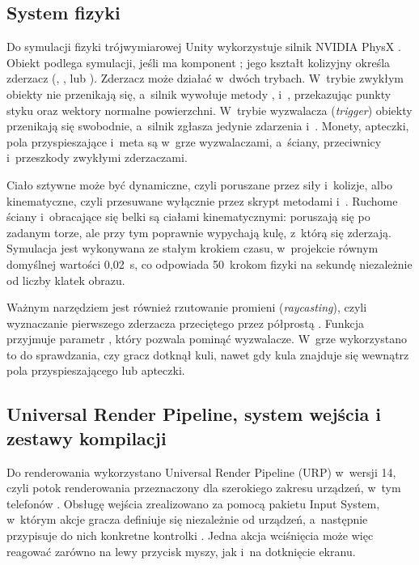 \subsection{System fizyki}

Do symulacji fizyki trójwymiarowej Unity wykorzystuje silnik NVIDIA PhysX
\cite{unity-physics}. Obiekt podlega symulacji, jeśli ma komponent ;
jego kształt kolizyjny określa zderzacz (, ,
 lub ). Zderzacz może działać w~dwóch trybach.
W~trybie zwykłym obiekty nie przenikają się, a~silnik wywołuje metody
,  i~, przekazując punkty
styku oraz wektory normalne powierzchni. W~trybie wyzwalacza (\emph{trigger}) obiekty
przenikają się swobodnie, a~silnik zgłasza jedynie zdarzenia 
i~. Monety, apteczki, pola przyspieszające i~meta są w~grze
wyzwalaczami, a~ściany, przeciwnicy i~przeszkody zwykłymi zderzaczami.

Ciało sztywne może być dynamiczne, czyli poruszane przez siły i~kolizje, albo kinematyczne,
czyli przesuwane wyłącznie przez skrypt metodami  i~.
Ruchome ściany i~obracające się belki są ciałami kinematycznymi: poruszają się po zadanym
torze, ale przy tym poprawnie wypychają kulę, z~którą się zderzają. Symulacja jest
wykonywana ze stałym krokiem czasu, w~projekcie równym domyślnej wartości 0{,}02~s,
co odpowiada 50~krokom fizyki na sekundę niezależnie od liczby klatek obrazu.

Ważnym narzędziem jest również rzutowanie promieni (\emph{raycasting}), czyli wyznaczanie
pierwszego zderzacza przeciętego przez półprostą \cite{unity-raycast}. Funkcja
 przyjmuje parametr , który pozwala
pominąć wyzwalacze. W~grze wykorzystano to do sprawdzania, czy gracz dotknął kuli,
nawet gdy kula znajduje się wewnątrz pola przyspieszającego lub apteczki.

\subsection{Universal Render Pipeline, system wejścia i zestawy kompilacji}

Do renderowania wykorzystano Universal Render Pipeline (URP) w~wersji 14, czyli potok
renderowania przeznaczony dla szerokiego zakresu urządzeń, w~tym telefonów \cite{urp}.
Obsługę wejścia zrealizowano za pomocą pakietu Input System, w~którym akcje gracza
definiuje się niezależnie od urządzeń, a~następnie przypisuje do nich konkretne kontrolki
\cite{inputsystem}. Jedna akcja wciśnięcia może więc reagować zarówno na lewy przycisk
myszy, jak i~na dotknięcie ekranu.

